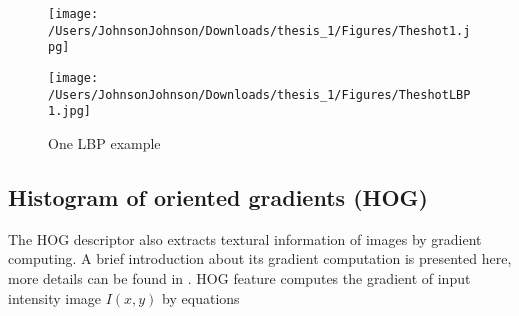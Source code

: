 \begin{figure}[H]
\begin{minipage}[t]{0.5\linewidth}
\centering
\texttt{[image: /Users/JohnsonJohnson/Downloads/thesis\_1/Figures/Theshot1.jpg]}
\end{minipage}%
\begin{minipage}[t]{0.5\linewidth}
\centering
\texttt{[image: /Users/JohnsonJohnson/Downloads/thesis\_1/Figures/TheshotLBP1.jpg]}
\end{minipage}
\caption{One LBP example}
\label{LBPdemoshot}
\end{figure}


\subsection{Histogram of oriented gradients (HOG)}
The HOG \cite{HOG} descriptor also extracts textural information of images by gradient computing. A brief introduction about its gradient computation is presented here, more details can be found in \cite{HOG}. HOG feature computes the gradient of input intensity  image $I(x, y)$ by equations 

